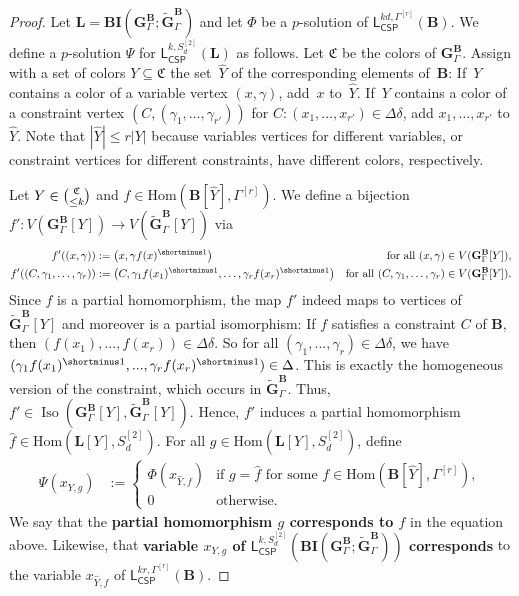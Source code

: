 \documentclass[a4paper,english, thm-restate]{lipics-v2021}
\newcommand{\defining}[1]{\textbf{#1}}
\newcommand{\inv}[1]{#1^{\shortminus 1}}
\newcommand{\CFIsym}{\mathbf{G}}
\newcommand{\CFIA}[2]{\CFIsym_{#1}^{#2}}
\newcommand{\CFIB}[2]{\widetilde{\CFIsym}_{#1}^{#2}}
\newcommand{\StructB}{\mathbf{B}}
\newcommand{\StructL}{\mathbf{L}}
\newcommand{\Hom}[2]{\mathrm{Hom}(#1,#2)}
\newcommand{\leqs}{\mathsf{L}}
\newcommand{\cspiso}[3]{\leqs^{#1,#2}_{\mathsf{CSP}}(#3)}
\newcommand{\isos}[2]{\operatorname*{Iso}(#1,#2)}
\newcommand{\bcisosys}[2]{\mathbf{BI}(#1;#2)}
\newcommand{\colors}{\mathfrak{C}}
\newcommand{\CosetGrpTmplt}[2]{#1^{[#2]}}
\newcommand{\Sym}[1]{S_{#1}}
\newcommand{\SymStruct}[2]{\CosetGrpTmplt{\Sym{#1}}{#2}}
\begin{document}
	\begin{proof}
		Let $\StructL = \bcisosys{\CFIA{\Gamma}{\StructB}}{\CFIB{\Gamma}{\StructB}}$ and
		let $\Phi$ be a $p$-solution of $\cspiso{kd}{\CosetGrpTmplt{\Gamma}{r}}{\StructB}$.
		We define a $p$-solution $\Psi$ for $\cspiso{k}{\SymStruct{d}{2}}{\StructL}$ as follows.
		Let $\colors$ be the colors of $\CFIA{\Gamma}{\StructB}$.
		Assign with a set of colors $Y \subseteq \colors$
		the set~$\hat{Y}$ of the corresponding elements of~$\StructB$:
		If~$Y$ contains a color of a variable vertex $(x,\gamma)$,
		add~$x$ to~$\hat{Y}$.
		If~$Y$ contains a color of a constraint vertex $(C,(\gamma_1,\dots,\gamma_{r'}))$ for $C\colon (x_1,\dots,x_{r'}) \in \Delta\delta$, add $x_1, \dots, x_{r'}$ to $\hat{Y}$.
		Note that $|\hat{Y}| \leq r |Y|$ because variables vertices for different variables, or constraint vertices for different constraints, have different colors, respectively.
		
		Let $Y \in \tbinom{\colors}{\leq k}$ and 
		$f\in \Hom{\StructB[\hat{Y}]}{\CosetGrpTmplt{\Gamma}{r}}$.
		We define a bijection $f' \colon V(\CFIA{\Gamma}{\StructB}[Y]) \to V(\CFIB{\Gamma}{\StructB}[Y])$ via
		\begin{align*}
			f'((x,\gamma)) &:=\left(x, \gamma\inv{f(x)} \right) & \text{ for all } (x,\gamma) \in V(\CFIA{\Gamma}{\StructB}[Y]),\\
			f'((C, \gamma_1,\dots,\gamma_r)) & := \left(C, \gamma_1\inv{f(x_1)} , \dots,  \gamma_r\inv{f(x_r)}\right) & \text{for all }(C, \gamma_1,\dots,\gamma_r) \in V(\CFIA{\Gamma}{\StructB}[Y]).
		\end{align*}
		Since $f$ is a partial homomorphism, the map $f'$ indeed maps to vertices of $\CFIB{\Gamma}{\StructB}[Y]$ and moreover is a partial isomorphism: 
		If $f$ satisfies a constraint $C$ of $\StructB$, then $(f(x_1),...,f(x_r)) \in \Delta\delta$. So for all $(\gamma_1,...,\gamma_r) \in \Delta\delta$, we have $(\gamma_1\inv{f(x_1)},...,\gamma_r\inv{f(x_r)}) \in \Delta$. This is exactly the homogeneous version of the constraint, which occurs in $\CFIB{\Gamma}{\StructB}$. Thus, $f' \in \isos{\CFIA{\Gamma}{\StructB}[Y]}{\CFIB{\Gamma}{\StructB}[Y]}$.
		Hence, $f'$ induces a partial homomorphism $\hat{f} \in \Hom{\StructL[Y]}{\SymStruct{d}{2}}$.
		For all $g \in \Hom{\StructL[Y]}{\SymStruct{d}{2}}$, define
		\begin{align*}
			\Psi(x_{Y,g}) &:= \begin{cases}
				\Phi(x_{\hat{Y},f}) & \text{if } g = \hat{f} \text{ for some } f\in \Hom{\StructB[\hat{Y}]}{\CosetGrpTmplt{\Gamma}{r}},\\
				0 & \text{otherwise.}
			\end{cases}
		\end{align*}
		We say that the \defining{partial homomorphism $g$
			corresponds to $f$} in the equation above.
		Likewise, that \defining{variable $x_{Y,g}$ of $\cspiso{k}{\SymStruct{d}{2}}{\bcisosys{\CFIA{\Gamma}{\StructB}}{\CFIB{\Gamma}{\StructB}}}$ 
			corresponds} to the variable $x_{\hat{Y},f}$ of $\cspiso{kr}{\CosetGrpTmplt{\Gamma}{r}}{\StructB}$.
		

\end{proof}
\end{document}
